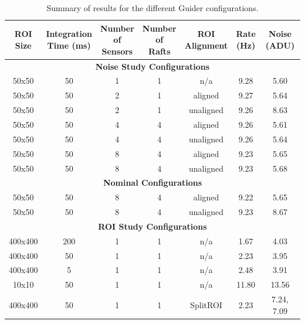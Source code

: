 \begin{longtable}{|c|c|c|c|c|c|c|}
\caption{Summary of results for the different Guider configurations.} \label{tab:gds_configs} \\
\hline
\makecell{\textbf{ROI} \\ \textbf{Size}} & 
\makecell{\textbf{Integration} \\ \textbf{Time (ms)}} & 
\makecell{\textbf{Number} \\ \textbf{of} \\ \textbf{Sensors}} &
\makecell{\textbf{Number} \\ \textbf{of} \\ \textbf{Rafts}} &
\makecell{\textbf{ROI} \\ \textbf{Alignment}} &
\makecell{\textbf{Rate} \\ \textbf{(Hz)}} &
\makecell{\textbf{Noise} \\ \textbf{(ADU)}} \\
\hline
\hline
\endhead
\multicolumn{7}{|c|}{\textbf{Noise Study Configurations}} \\
\hline
50x50   & 50  & 1 & 1 & n/a       &  9.28 & 5.60 \\ %
50x50   & 50  & 2 & 1 & aligned   &  9.27 & 5.64 \\ %
50x50   & 50  & 2 & 1 & unaligned &  9.26 & 8.63 \\ %
50x50   & 50  & 4 & 4 & aligned   &  9.26 & 5.61 \\ %
50x50   & 50  & 4 & 4 & unaligned &  9.26 & 5.64 \\ %
50x50   & 50  & 8 & 4 & aligned   &  9.23 & 5.65 \\ %
50x50   & 50  & 8 & 4 & unaligned &  9.23 & 5.68 \\ %
\hline
\multicolumn{7}{|c|}{\textbf{Nominal Configurations}} \\
\hline
50x50   & 50  & 8 & 4 & aligned   &  9.22 & 5.65 \\ %
50x50   & 50  & 8 & 4 & unaligned &  9.23 & 8.67 \\ %
\hline
\multicolumn{7}{|c|}{\textbf{ROI Study Configurations}} \\
\hline
400x400 & 200 & 1 & 1 & n/a       &  1.67 & 4.03 \\ %
400x400 &  50 & 1 & 1 & n/a       &  2.23 & 3.95 \\ %
400x400 &   5 & 1 & 1 & n/a       &  2.48 & 3.91 \\ %
10x10   &  50 & 1 & 1 & n/a       & 11.80 & 13.56 \\ %
400x400 &  50 & 1 & 1 & SplitROI  &  2.23 & 7.24, 7.09 \\ %
\hline
\end{longtable}

